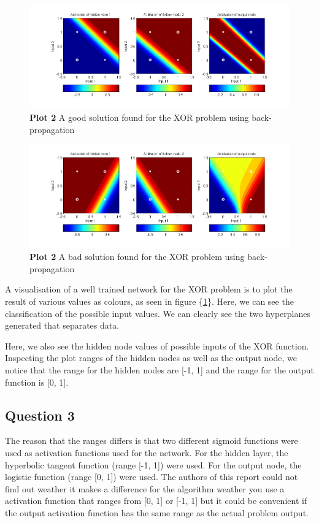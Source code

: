 \documentclass[a4paper]{article}
\begin{document}
\begin{figure}[h!] %
	\includegraphics[scale=0.55]{good_bprop_xor_plot.png}
	\caption{\label{fig:good_bprop_xor_plot}\textbf{Plot 2} A good solution found for the XOR problem using back-propagation}
\end{figure}
\begin{figure}[h!] %
	\includegraphics[scale=0.55]{bad_bprop_xor_plot.png}
	\caption{\label{fig:bad_bprop_xor_plot}\textbf{Plot 2} A bad solution found for the XOR problem using back-propagation}
\end{figure}
A visualisation of a well trained network for the XOR problem  
is to plot the result of various values 
as colours, as seen in figure \{\ref{fig:good_bprop_xor_plot}\}. 
Here, we can see the classification of the possible input values. We can 
clearly see the two hyperplanes generated that separates data. 

Here, we also see the hidden node values of possible inputs of the XOR function.
Inspecting the plot ranges of the hidden nodes as well as the output node, we notice that
the range for the hidden nodes are [-1, 1] and the range for the output function is [0, 1].
\subsection*{Question 3}
The reason that the ranges differs is that two 
different sigmoid functions were used as activation functions used for the network. 
For the hidden layer, the hyperbolic tangent function (range [-1, 1]) were used. 
For the output node, the logistic function (range [0, 1]) were used. The authors of 
this report could not find out weather it makes a difference for the algorithm weather 
you use a activation function that ranges from [0, 1] or [-1, 1] but it could be 
convenient if the output activation function has the same range as the actual problem 
output. 
\end{document}

